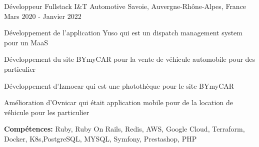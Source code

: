\begin{cventries}
  \cventry
    {Développeur Fullstack}
    {I\&T Automotive}
    {Savoie, Auvergne-Rhône-Alpes, France}
    {Mars 2020 - Janvier 2022}
    {
      \begin{cvitems}
        \item {Développement de l'application Yuso qui est un dispatch management system pour un MaaS}
        \item {Développement du site BYmyCAR pour la vente de véhicule automobile pour des particulier}
        \item {Développement d'Izmocar qui est une photothèque pour le site BYmyCAR}
        \item {Amélioration d'Ovnicar qui était application mobile pour de la location de véhicule pour les particulier}
        \item {\textbf{Compétences:}  Ruby, Ruby On Rails, Redis, AWS, Google Cloud, Terraform, Docker, K8s,PostgreSQL, MYSQL, Symfony, Prestashop, PHP}
      \end{cvitems}
    }
\end{cventries}
